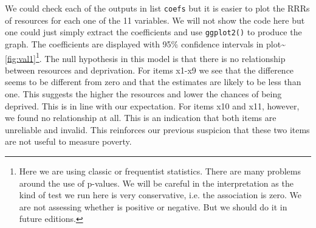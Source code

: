 \documentclass[]{book}
\newenvironment{Shaded}{\begin{snugshade}}{\end{snugshade}}
\newcommand{\ControlFlowTok}[1]{\textcolor[rgb]{0.13,0.29,0.53}{\textbf{#1}}}
\newcommand{\DataTypeTok}[1]{\textcolor[rgb]{0.13,0.29,0.53}{#1}}
\newcommand{\DecValTok}[1]{\textcolor[rgb]{0.00,0.00,0.81}{#1}}
\newcommand{\KeywordTok}[1]{\textcolor[rgb]{0.13,0.29,0.53}{\textbf{#1}}}
\newcommand{\NormalTok}[1]{#1}
\newcommand{\OperatorTok}[1]{\textcolor[rgb]{0.81,0.36,0.00}{\textbf{#1}}}
\newcommand{\StringTok}[1]{\textcolor[rgb]{0.31,0.60,0.02}{#1}}
\let\rmarkdownfootnote\footnote%
\def\footnote{\protect\rmarkdownfootnote}
\begin{document}
We could check each of the outputs in list \texttt{coefs} but it is easier to plot the RRRs of resources for each one of the 11 variables. We will not show the code here but one could just simply extract the coefficients and use \texttt{ggplot2()} to produce the graph. The coefficients are displayed with 95\% confidence intervals in plot\textasciitilde{}\ref{fig:val1}\footnote{Here we are using classic or frequentist statistics. There are many problems around the use of p-values. We will be careful in the interpretation as the kind of test we run here is very conservative, i.e. the association is zero. We are not assessing whether is positive or negative. But we should do it in future editions.}. The null hypothesis in this model is that there is no relationship between resources and deprivation. For items x1-x9 we see that the difference seems to be different from zero and that the estimates are likely to be less than one. This suggests the higher the resources and lower the chances of being deprived. This is in line with our expectation. For items x10 and x11, however, we found no relationship at all. This is an indication that both items are unreliable and invalid. This reinforces our previous suspicion that these two items are not useful to measure poverty.

\begin{Shaded}
\end{Shaded}
\end{document}
